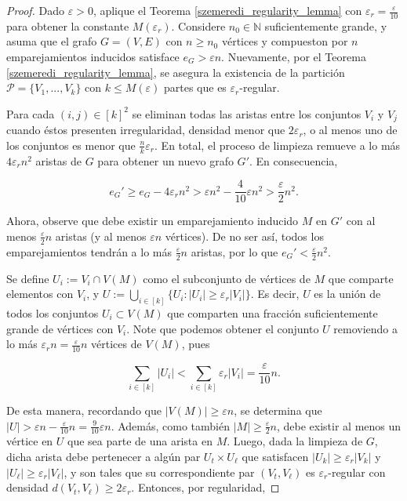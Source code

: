 \documentclass{article}[14pts]
\let\varepsilon=\varepsilon
\begin{document}
\begin{proof}
    Dado $\varepsilon > 0$, aplique el Teorema \ref{szemeredi_regularity_lemma} con $\varepsilon_r = \frac{\varepsilon}{10}$ para obtener la constante $M(\varepsilon_r)$. Considere $n_0\in\mathbb{N}$ suficientemente grande, y asuma que el grafo $G = (V,E)$ con $n\geq n_0$ vértices y compueston por $n$ emparejamientos inducidos satisface $e_G > \varepsilon n$. Nuevamente, por el Teorema \ref{szemeredi_regularity_lemma}, se asegura la existencia de la partición $\mathcal{P} = \lbrace V_1,...,V_k\rbrace$ con $k\leq M(\varepsilon)$ partes que es $\varepsilon_r$-regular.\medskip
    
    Para cada $(i,j)\in [k]^{2}$ se eliminan todas las aristas entre los conjuntos $V_i$ y $V_j$ cuando éstos presenten irregularidad, densidad menor que $2\varepsilon_r$, o al menos uno de los conjuntos es menor que $\frac{n}{k}\varepsilon_r$. En total, el proceso de limpieza remueve a lo más $4\varepsilon_r n^{2}$ aristas de $G$ para obtener un nuevo grafo $G'$. En consecuencia,\medskip
    
    \begin{equation*}
        e_G' \geq e_G - 4\varepsilon_r n^{2} > \varepsilon n^{2} - \frac{4}{10}\varepsilon n^{2} > \frac{\varepsilon}{2}n^{2}.
    \end{equation*}\medskip

    Ahora, observe que debe existir un emparejamiento inducido $M$ en $G'$ con al menos $\frac{\varepsilon}{2}n$ aristas (y al menos $\varepsilon n$ vértices). De no ser así, todos los emparejamientos tendrán a lo más $\frac{\varepsilon}{2}n$ aristas, por lo que $e_G' < \frac{\varepsilon}{2}n^{2}$.\medskip

    Se define $U_i := V_i \cap V(M)$ como el subconjunto de vértices de $M$ que comparte elementos con $V_i$, y $U := \displaystyle\bigcup_{i\in [k]} \lbrace U_i : |U_i| \geq \varepsilon_r |V_i|\rbrace$. Es decir, $U$ es la unión de todos los conjuntos $U_i \subset V(M)$ que comparten una fracción suficientemente grande de vértices con $V_i$. Note que podemos obtener el conjunto $U$ removiendo a lo más $\varepsilon_r n = \frac{\varepsilon}{10}n$ vértices de $V(M)$, pues\medskip

    \begin{equation*}
        \sum_{i\in [k]} |U_i| < \sum_{i\in [k]} \varepsilon_r |V_i| = \frac{\varepsilon}{10} n.
    \end{equation*}\medskip

    De esta manera, recordando que $|V(M)| \geq \varepsilon n$, se determina que $|U| > \varepsilon n - \frac{\varepsilon}{10}n = \frac{9}{10}\varepsilon n$. Además, como también $|M| \geq \frac{\varepsilon}{2}n$, debe existir al menos un vértice en $U$ que sea parte de una arista en $M$. Luego, dada la limpieza de $G$, dicha arista debe pertenecer a algún par $U_t\times U_\ell$ que satisfacen $|U_k| \geq \varepsilon_r |V_k|$ y  $|U_\ell| \geq \varepsilon_r |V_\ell|$, y son tales que 
    su correspondiente par $(V_t, V_\ell)$ es $\varepsilon_r$-regular con densidad $d(V_t, V_\ell) \geq 2\varepsilon_r$. Entonces, por regularidad,


\end{proof}
\end{document}
